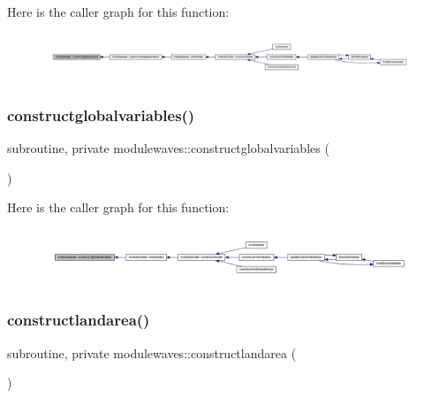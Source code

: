 Here is the caller graph for this function\+:\nopagebreak
\begin{figure}[H]
\begin{center}
\leavevmode
\includegraphics[width=350pt]{namespacemodulewaves_a069825270a300a70ba32518f571bcb90_icgraph}
\end{center}
\end{figure}
\mbox{\label{namespacemodulewaves_ad44cb14b28b28a735447792076b5f1f5}} 
\subsubsection{\texorpdfstring{constructglobalvariables()}{constructglobalvariables()}}
{\footnotesize\ttfamily subroutine, private modulewaves\+::constructglobalvariables (\begin{DoxyParamCaption}{ }\end{DoxyParamCaption})\hspace{0.3cm}{\ttfamily [private]}}

Here is the caller graph for this function\+:\nopagebreak
\begin{figure}[H]
\begin{center}
\leavevmode
\includegraphics[width=350pt]{namespacemodulewaves_ad44cb14b28b28a735447792076b5f1f5_icgraph}
\end{center}
\end{figure}
\mbox{\label{namespacemodulewaves_a509d19a4e531573684282a3b2e47fb4a}} 
\subsubsection{\texorpdfstring{constructlandarea()}{constructlandarea()}}
{\footnotesize\ttfamily subroutine, private modulewaves\+::constructlandarea (\begin{DoxyParamCaption}{ }\end{DoxyParamCaption})\hspace{0.3cm}{\ttfamily [private]}}

